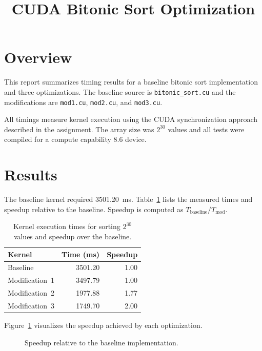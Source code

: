 \documentclass{article}
\begin{document}
\title{CUDA Bitonic Sort Optimization}
\author{}
\date{}
\maketitle

\section{Overview}
This report summarizes timing results for a baseline bitonic sort implementation and three optimizations. The baseline source is \texttt{bitonic\_sort.cu} and the modifications are \texttt{mod1.cu}, \texttt{mod2.cu}, and \texttt{mod3.cu}.

All timings measure kernel execution using the CUDA synchronization approach described in the assignment. The array size was $2^{30}$ values and all tests were compiled for a compute capability 8.6 device.

\section{Results}
The baseline kernel required 3501.20~ms. Table~\ref{tab:times} lists the measured times and speedup relative to the baseline. Speedup is computed as $T_{\text{baseline}}/T_{\text{mod}}$.

\begin{table}[h]
\centering
\begin{tabular}{lrr}
\toprule
Kernel & Time (ms) & Speedup \\ \midrule
Baseline & 3501.20 & 1.00 \\
Modification~1 & 3497.79 & 1.00 \\
Modification~2 & 1977.88 & 1.77 \\
Modification~3 & 1749.70 & 2.00 \\ \bottomrule
\end{tabular}
\caption{Kernel execution times for sorting $2^{30}$ values and speedup over the baseline.}
\label{tab:times}
\end{table}

Figure~\ref{fig:speedup} visualizes the speedup achieved by each optimization.

\begin{figure}[h]
\centering
{}
\caption{Speedup relative to the baseline implementation.}
\label{fig:speedup}
\end{figure}
\end{document}
